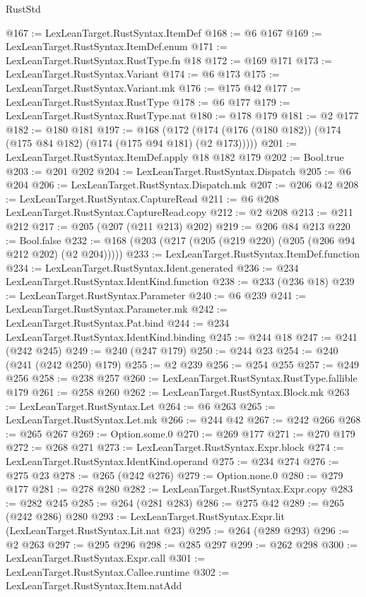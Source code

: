 \begin{lexlean}{RustStd}
\begin{coremodule}
@167 := LexLeanTarget.RustSyntax.ItemDef
@168 := @6 @167
@169 := LexLeanTarget.RustSyntax.ItemDef.enum
@171 := LexLeanTarget.RustSyntax.RustType.fn @18
@172 := @169 @171
@173 := LexLeanTarget.RustSyntax.Variant
@174 := @6 @173
@175 := LexLeanTarget.RustSyntax.Variant.mk
@176 := @175 @42
@177 := LexLeanTarget.RustSyntax.RustType
@178 := @6 @177
@179 := LexLeanTarget.RustSyntax.RustType.nat
@180 := @178 @179
@181 := @2 @177
@182 := @180 @181
@197 := @168
    (@172 (@174 (@176 (@180 @182)) (@174 (@175 @84 @182) (@174 (@175 @94 @181) (@2 @173)))))
@201 := LexLeanTarget.RustSyntax.ItemDef.apply @18 @182 @179
@202 := Bool.true
@203 := @201 @202
@204 := LexLeanTarget.RustSyntax.Dispatch
@205 := @6 @204
@206 := LexLeanTarget.RustSyntax.Dispatch.mk
@207 := @206 @42
@208 := LexLeanTarget.RustSyntax.CaptureRead
@211 := @6 @208 LexLeanTarget.RustSyntax.CaptureRead.copy
@212 := @2 @208
@213 := @211 @212
@217 := @205 (@207 (@211 @213) @202)
@219 := @206 @84 @213
@220 := Bool.false
@232 := @168 (@203 (@217 (@205 (@219 @220) (@205 (@206 @94 @212 @202) (@2 @204)))))
@233 := LexLeanTarget.RustSyntax.ItemDef.function
@234 := LexLeanTarget.RustSyntax.Ident.generated
@236 := @234 LexLeanTarget.RustSyntax.IdentKind.function
@238 := @233 (@236 @18)
@239 := LexLeanTarget.RustSyntax.Parameter
@240 := @6 @239
@241 := LexLeanTarget.RustSyntax.Parameter.mk
@242 := LexLeanTarget.RustSyntax.Pat.bind
@244 := @234 LexLeanTarget.RustSyntax.IdentKind.binding
@245 := @244 @18
@247 := @241 (@242 @245)
@249 := @240 (@247 @179)
@250 := @244 @23
@254 := @240 (@241 (@242 @250) @179)
@255 := @2 @239
@256 := @254 @255
@257 := @249 @256
@258 := @238 @257
@260 := LexLeanTarget.RustSyntax.RustType.fallible @179
@261 := @258 @260
@262 := LexLeanTarget.RustSyntax.Block.mk
@263 := LexLeanTarget.RustSyntax.Let
@264 := @6 @263
@265 := LexLeanTarget.RustSyntax.Let.mk
@266 := @244 @42
@267 := @242 @266
@268 := @265 @267
@269 := Option.some.{0}
@270 := @269 @177
@271 := @270 @179
@272 := @268 @271
@273 := LexLeanTarget.RustSyntax.Expr.block
@274 := LexLeanTarget.RustSyntax.IdentKind.operand
@275 := @234 @274
@276 := @275 @23
@278 := @265 (@242 @276)
@279 := Option.none.{0}
@280 := @279 @177
@281 := @278 @280
@282 := LexLeanTarget.RustSyntax.Expr.copy
@283 := @282 @245
@285 := @264 (@281 @283)
@286 := @275 @42
@289 := @265 (@242 @286) @280
@293 := LexLeanTarget.RustSyntax.Expr.lit (LexLeanTarget.RustSyntax.Lit.nat @23)
@295 := @264 (@289 @293)
@296 := @2 @263
@297 := @295 @296
@298 := @285 @297
@299 := @262 @298
@300 := LexLeanTarget.RustSyntax.Expr.call
@301 := LexLeanTarget.RustSyntax.Callee.runtime
@302 := LexLeanTarget.RustSyntax.Item.natAdd

\end{coremodule}
\end{lexlean}

